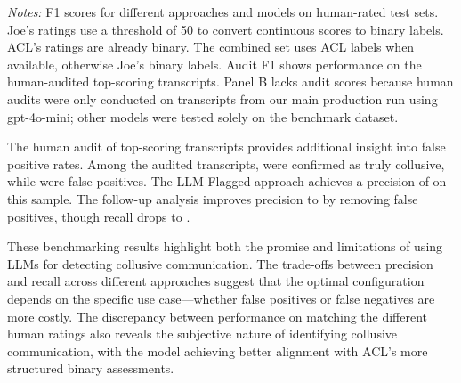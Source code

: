 \begin{table}[ht]
    \centering
    \caption{Benchmarking Results}
    \label{tab:benchmarking}
    
    \begin{minipage}{\textwidth}
        \vspace{1em}
        \footnotesize
        \textit{Notes:} F1 scores for different approaches and models on human-rated test sets. Joe's ratings use a threshold of 50 to convert continuous scores to binary labels. ACL's ratings are already binary. The combined set uses ACL labels when available, otherwise Joe's binary labels. Audit F1 shows performance on the  human-audited top-scoring transcripts. Panel B lacks audit scores because human audits were only conducted on transcripts from our main production run using gpt-4o-mini; other models were tested solely on the benchmark dataset.
    \end{minipage}
\end{table}

The human audit of top-scoring transcripts provides additional insight into false positive rates. Among the  audited transcripts,  were confirmed as truly collusive, while  were false positives. The LLM Flagged approach achieves a precision of  on this sample. The follow-up analysis improves precision to  by removing  false positives, though recall drops to .

These benchmarking results highlight both the promise and limitations of using LLMs for detecting collusive communication. The trade-offs between precision and recall across different approaches suggest that the optimal configuration depends on the specific use case—whether false positives or false negatives are more costly. The discrepancy between performance on matching the different human ratings also reveals the subjective nature of identifying collusive communication, with the model achieving better alignment with ACL's more structured binary assessments.